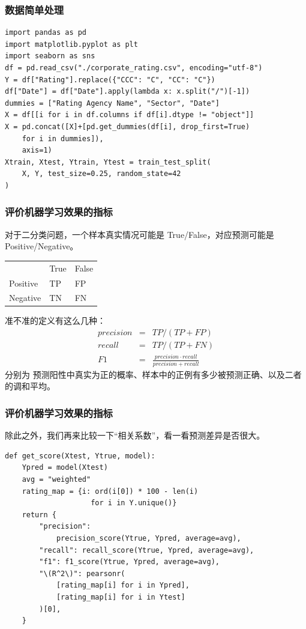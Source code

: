 \documentclass{ctexbeamer}
\begin{document}
\begin{frame}[fragile]
    \frametitle{数据简单处理}
    \begin{verbatim}
import pandas as pd
import matplotlib.pyplot as plt
import seaborn as sns
df = pd.read_csv("./corporate_rating.csv", encoding="utf-8")
Y = df["Rating"].replace({"CCC": "C", "CC": "C"})
df["Date"] = df["Date"].apply(lambda x: x.split("/")[-1])
dummies = ["Rating Agency Name", "Sector", "Date"]
X = df[[i for i in df.columns if df[i].dtype != "object"]]
X = pd.concat([X]+[pd.get_dummies(df[i], drop_first=True)
    for i in dummies]),
    axis=1)
Xtrain, Xtest, Ytrain, Ytest = train_test_split(
    X, Y, test_size=0.25, random_state=42
)
\end{verbatim}
\end{frame}
\begin{frame}
    \frametitle{评价机器学习效果的指标}
    对于二分类问题，一个样本真实情况可能是 True/False，对应预测可能是 Positive/Negative。
    \begin{center}
        \begin{tabular}{lll}
                     & True & False \\
            Positive & TP   & FP    \\
            Negative & TN   & FN    \\
        \end{tabular}
    \end{center}
    准不准的定义有这么几种：
    \begin{eqnarray}
        precision & = & TP / (TP + FP) \\
        recall & = & TP / (TP + FN) \nonumber\\
        F1 & = & \frac{precision\cdot recall}{precision+recall}\nonumber
    \end{eqnarray}
    分别为 预测阳性中真实为正的概率、样本中的正例有多少被预测正确、以及二者的调和平均。
\end{frame}

\begin{frame}[fragile]
    \frametitle{评价机器学习效果的指标}
    除此之外，我们再来比较一下“相关系数”，看一看预测差异是否很大。
    \begin{verbatim}
def get_score(Xtest, Ytrue, model):
    Ypred = model(Xtest)
    avg = "weighted"
    rating_map = {i: ord(i[0]) * 100 - len(i)
                    for i in Y.unique()}
    return {
        "precision":
            precision_score(Ytrue, Ypred, average=avg),
        "recall": recall_score(Ytrue, Ypred, average=avg),
        "f1": f1_score(Ytrue, Ypred, average=avg),
        "\(R^2\)": pearsonr(
            [rating_map[i] for i in Ypred],
            [rating_map[i] for i in Ytest]
        )[0],
    }
\end{verbatim}
\end{frame}
\end{document}
